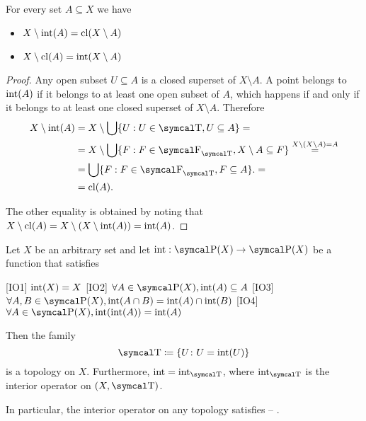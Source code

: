 \begin{proposition}\label{thm:interior_closure_complement} For every set \( A \subseteq X \) we have
  \begin{itemize}
    \item \( X \setminus \operatorname{int}(A) = \operatorname{cl}(X \setminus A) \)
    \item \( X \setminus \operatorname{cl}(A) = \operatorname{int}(X \setminus A) \)
  \end{itemize}
\end{proposition}
\begin{proof}
  Any open subset \( U \subseteq A \) is a closed superset of \( X \setminus A \). A point belongs to \( \operatorname{int}(A) \) if it belongs to at least one open subset of \( A \), which happens if and only if it belongs to at least one closed superset of \( X \setminus A \). Therefore
  \begin{align*}
    X \setminus \Int(A)
    &=
    X \setminus \bigcup \{ U : U \in \CT, U \subseteq A \}
    = \\ &=
    X \setminus \bigcup \{ F : F \in \CF_{\CT}, X \setminus A \subseteq F \}
    \overset {X \setminus (X \setminus A) = A} = \\ &=
    \bigcup \{ F : F \in \CF_{\CT}, F \subseteq A \}.
    = \\ &=
    \Cl(A).
  \end{align*}

  The other equality is obtained by noting that \( X \setminus \operatorname{cl}(A) = X \setminus (X \setminus \operatorname{int}(A)) = \operatorname{int}(A) \).
\end{proof}

\begin{proposition}\label{thm:interior_operator_axioms}
  Let \( X \) be an arbitrary set and let \( \Int: \Power(X) \to \Power(X) \) be a function that satisfies
  \begin{description}
    [IO1] \( \operatorname{int}(X) = X \)
    [IO2] \( \forall A \in \Power(X), \Int(A) \subseteq A \)
    [IO3] \( \forall A, B \in \Power(X), \Int(A \cap B) = \Int(A) \cap \Int(B) \)
    [IO4] \( \forall A \in \Power(X), \Int(\Int(A)) = \Int(A) \)
  \end{description}

  Then the family
  \begin{equation*}
    \CT \coloneqq \{ U \colon U = \Int(U) \}
  \end{equation*}
  is a topology on \( X \). Furthermore, \( \Int = \Int_{\CT} \), where \( \Int_{\CT} \) is the interior operator on \( (X, \CT) \).

  In particular, the interior operator on any topology satisfies  -- .
\end{proposition}

